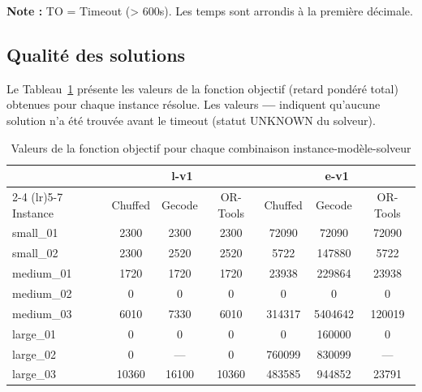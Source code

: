 \textbf{Note :} TO = Timeout (> 600s). Les temps sont arrondis à la première décimale.

\subsection{Qualité des solutions}

Le Tableau~\ref{tab:resultats_objectifs} présente les valeurs de la fonction objectif (retard pondéré total) obtenues pour chaque instance résolue. Les valeurs \textbf{---} indiquent qu'aucune solution n'a été trouvée avant le timeout (statut UNKNOWN du solveur).

\begin{table}[h]
	\centering
	\small
	\caption{Valeurs de la fonction objectif pour chaque combinaison instance-modèle-solveur}
	\label{tab:resultats_objectifs}
	\begin{tabular}{lcccccc}
		\toprule
		           & \multicolumn{3}{c}{\textbf{l-v1}} & \multicolumn{3}{c}{\textbf{e-v1}}                                          \\
		\cmidrule(lr){2-4} \cmidrule(lr){5-7}
		Instance   & Chuffed                                 & Gecode                                    & OR-Tools & Chuffed & Gecode & OR-Tools \\
		\midrule
		small\_01  & 2300                                    & 2300                                      & 2300     & 72090   & 72090  & 72090    \\
		small\_02  & 2300                                    & 2520                                      & 2520     & 5722    & 147880 & 5722     \\
		\midrule
		medium\_01 & 1720                                    & 1720                                      & 1720     & 23938   & 229864 & 23938    \\
		medium\_02 & 0                                       & 0                                         & 0        & 0       & 0      & 0        \\
		medium\_03 & 6010                                    & 7330                                      & 6010     & 314317  & 5404642 & 120019   \\
		\midrule
		large\_01  & 0                                       & 0                                         & 0        & 0       & 160000 & 0        \\
		large\_02  & 0                                       & ---                                       & 0        & 760099  & 830099 & ---      \\
		large\_03  & 10360                                   & 16100                                     & 10360    & 483585  & 944852 & 23791    \\
		\bottomrule
	\end{tabular}
\end{table}

